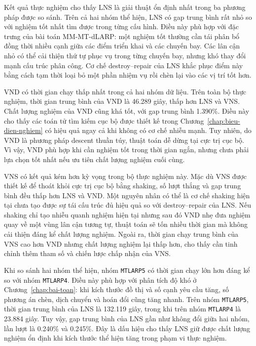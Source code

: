 Kết quả thực nghiệm cho thấy LNS là giải thuật ổn định nhất trong ba phương pháp được so sánh. Trên cả hai nhóm thể hiện, LNS có gap trung bình rất nhỏ so với nghiệm tốt nhất tìm được trong từng cấu hình. Điều này phù hợp với đặc trưng của bài toán MM-MT-dLARP: một nghiệm tốt thường cần tái phân bổ đồng thời nhiều cạnh giữa các điểm triển khai và các chuyến bay. Các lân cận nhỏ có thể cải thiện thứ tự phục vụ trong từng chuyến bay, nhưng khó thay đổi mạnh cấu trúc phân công. Cơ chế destroy--repair của LNS khắc phục điểm này bằng cách tạm thời loại bỏ một phần nhiệm vụ rồi chèn lại vào các vị trí tốt hơn.

VND có thời gian chạy thấp nhất trong cả hai nhóm dữ liệu. Trên toàn bộ thực nghiệm, thời gian trung bình của VND là 46.289 giây, thấp hơn LNS và VNS. Chất lượng nghiệm của VND cũng khá tốt, với gap trung bình 1.390\%. Điều này cho thấy các toán tử tìm kiếm cục bộ được thiết kế trong Chương~\ref{chap:bieu-dien-nghiem} có hiệu quả ngay cả khi không có cơ chế nhiễu mạnh. Tuy nhiên, do VND là phương pháp descent thuần túy, thuật toán dễ dừng tại cực trị cục bộ. Vì vậy, VND phù hợp khi cần nghiệm tốt trong thời gian ngắn, nhưng chưa phải lựa chọn tốt nhất nếu ưu tiên chất lượng nghiệm cuối cùng.

VNS có kết quả kém hơn kỳ vọng trong bộ thực nghiệm này. Mặc dù VNS được thiết kế để thoát khỏi cực trị cục bộ bằng shaking, số lượt thắng và gap trung bình đều thấp hơn LNS và VND. Một nguyên nhân có thể là cơ chế shaking hiện tại chưa tạo được sự tái cấu trúc đủ hiệu quả so với destroy--repair của LNS. Nếu shaking chỉ tạo nhiễu quanh nghiệm hiện tại nhưng sau đó VND nhẹ đưa nghiệm quay về một vùng lân cận tương tự, thuật toán sẽ tốn nhiều thời gian mà không cải thiện đáng kể chất lượng nghiệm. Ngoài ra, thời gian chạy trung bình của VNS cao hơn VND nhưng chất lượng nghiệm lại thấp hơn, cho thấy cần tinh chỉnh thêm tham số và chiến lược chấp nhận của VNS.

Khi so sánh hai nhóm thể hiện, nhóm \texttt{MTLARP5} có thời gian chạy lớn hơn đáng kể so với nhóm \texttt{MTLARP4}. Điều này phù hợp với phân tích độ khó ở Chương~\ref{chap:bai-toan}: khi kích thước đồ thị và số cạnh yêu cầu tăng, số phương án chèn, dịch chuyển và hoán đổi cũng tăng nhanh. Trên nhóm \texttt{MTLARP5}, thời gian trung bình của LNS là 132.119 giây, trong khi trên nhóm \texttt{MTLARP4} là 23.884 giây. Tuy vậy, gap trung bình của LNS gần như không đổi giữa hai nhóm, lần lượt là 0.240\% và 0.245\%. Đây là dấu hiệu cho thấy LNS giữ được chất lượng nghiệm ổn định khi kích thước thể hiện tăng trong phạm vi thực nghiệm.

